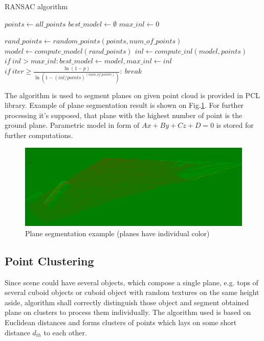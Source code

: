 \documentclass{ctuthesis}
\begin{document}
\begin{algorithm}
\caption{RANSAC algorithm}\label{ransac}
\begin{algorithmic}[1]
\State $points \gets all\_points$
\State $best\_model \gets \emptyset$
\State $max\_inl \gets 0$

\State $rand\_points \gets random\_points(points, num\_of\_points)$
\State $model \gets compute\_model(rand\_points)$
\State $inl \gets compute\_inl(model, points)$
\State $if\ inl > max\_inl: best\_model \gets model, max\_inl \gets inl$
\State $if\ iter \geq \frac{\ln{(1 - p)}}{\ln{(1 - (inl/points)^(num\_of\_points))}}: \ break$
\EndFor

\end{algorithmic}
\end{algorithm}


The algorithm is used to segment planes on given point cloud is provided in PCL library. Example of plane segmentation result is shown on Fig.\ref{fig:plane_segm}. For further processing it's supposed, that plane with the highest number of point is the ground plane. Parametric model in form of $Ax + By + Cz + D = 0$ is stored for further computations.

\begin{figure}[htbp]
    \centering
    \includegraphics[width=\textwidth]{segmented_scene.png}
    \caption{Plane segmentation example (planes have individual color)}
    \label{fig:plane_segm}
\end{figure}

\subsection{Point Clustering}

Since scene could have several objects, which compose a single plane, e.g. tops of several cuboid objects or cuboid object with random textures on the same height aside, algorithm shall correctly distinguish those object and segment obtained plane on clusters to process them individually. The algorithm used is based on Euclidean distances and forms clusters of points which lays on some short distance \emph{$d_{th}$} to each other.
\end{document}
